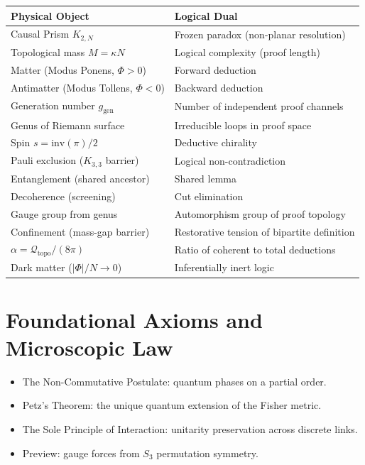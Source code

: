 \documentclass[11pt, a4paper, openany]{book}
\newenvironment{introduction}[1][Modulo Overview]{%
  \begin{tcolorbox}[
    enhanced,colback=structure!5,colframe=structure,
    colbacktitle=structure,coltitle=white,
    fonttitle=\small\bfseries,title={#1},
    arc=2pt,boxrule=0.7pt,
    left=8pt,right=8pt,top=6pt,bottom=6pt,
    before skip=12pt,after skip=12pt
  ]\itshape\begin{itemize}[leftmargin=*,itemsep=2pt,parsep=0pt]
}{%
  \end{itemize}\end{tcolorbox}
}
\begin{document}
\begin{center}
\begin{tabular}{@{}ll@{}}
\toprule
\textbf{Physical Object} & \textbf{Logical Dual} \\
\midrule
Causal Prism $K_{2,N}$ & Frozen paradox (non-planar resolution) \\
Topological mass $M = \kappa N$ & Logical complexity (proof length) \\
Matter (Modus Ponens, $\Phi > 0$) & Forward deduction \\
Antimatter (Modus Tollens, $\Phi < 0$) & Backward deduction \\
Generation number $g_{\mathrm{gen}}$ & Number of independent proof channels \\
Genus of Riemann surface & Irreducible loops in proof space \\
Spin $s = \mathrm{inv}(\pi)/2$ & Deductive chirality \\
Pauli exclusion ($K_{3,3}$ barrier) & Logical non-contradiction \\
Entanglement (shared ancestor) & Shared lemma \\
Decoherence (screening) & Cut elimination \\
Gauge group from genus & Automorphism group of proof topology \\
Confinement (mass-gap barrier) & Restorative tension of bipartite definition \\
$\alpha = \mathcal{Q}_{\mathrm{topo}}/(8\pi)$ & Ratio of coherent to total deductions \\
Dark matter ($|\Phi|/N \to 0$) & Inferentially inert logic \\
\bottomrule
\end{tabular}
\end{center}

\mainmatter


\chapter*{Foundational Axioms and Microscopic Law}

\begin{introduction}[Preamble to Volume II]
  \item The Non-Commutative Postulate: quantum phases on a partial order.
  \item Petz's Theorem: the unique quantum extension of the Fisher metric.
  \item The Sole Principle of Interaction: unitarity preservation across discrete links.
  \item Preview: gauge forces from $S_3$ permutation symmetry.
\end{introduction}
\end{document}
